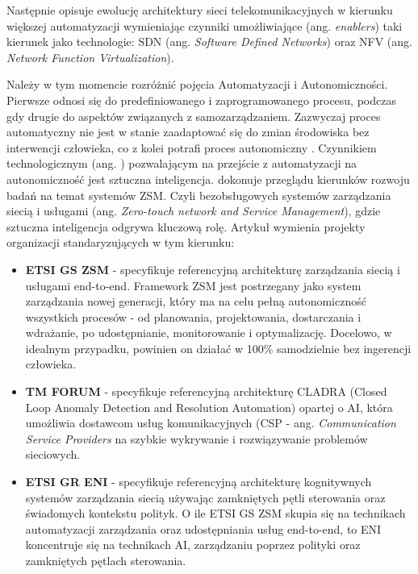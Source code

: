 Następnie \cite{doyle2014} opisuje ewolucję architektury sieci telekomunikacyjnych w kierunku większej automatyzacji wymieniając czynniki umożliwiające (ang. \textit{enablers}) taki kierunek jako technologie: SDN (ang. \textit{Software Defined Networks}) oraz NFV (ang. \textit{Network Function Virtualization}).

Należy w tym momencie rozróżnić pojęcia Automatyzacji i Autonomiczności. Pierwsze odnosi się do predefiniowanego i zaprogramowanego procesu, podczas gdy drugie do aspektów związanych z samozarządzaniem. Zazwyczaj proces automatyczny nie jest w stanie zaadaptować się do zmian środowiska bez interwencji człowieka, co z kolei potrafi proces autonomiczny \cite{ngmn2022}. Czynnikiem technologicznym (ang. ) pozwalającym na przejście z automatyzacji na autonomiczność jest sztuczna inteligencja. \cite{benzaid2020} dokonuje przeglądu kierunków rozwoju badań na temat systemów ZSM. Czyli bezobsługowych systemów zarządzania siecią i usługami (ang. \textit{Zero-touch network and Service Management}), gdzie sztuczna inteligencja odgrywa kluczową rolę. Artykuł wymienia projekty organizacji standaryzujących w tym kierunku:
\begin{itemize}
    \item \textbf{ETSI GS ZSM} - specyfikuje referencyjną architekturę zarządzania siecią i usługami end-to-end. Framework ZSM jest postrzegany jako system zarządzania nowej generacji, który ma na celu pełną autonomiczność wszystkich procesów - od planowania, projektowania, dostarczania i wdrażanie, po udostępnianie, monitorowanie i optymalizację. Docelowo, w idealnym przypadku, powinien on działać w 100\% samodzielnie bez ingerencji człowieka. 
    \item \textbf{TM FORUM} - specyfikuje referencyjną architekturę CLADRA (Closed Loop Anomaly Detection and Resolution Automation) opartej o AI, która umożliwia dostawcom usług komunikacyjnych (CSP - ang. \textit{Communication Service Providers} na szybkie wykrywanie i rozwiązywanie problemów sieciowych.
    \item \textbf{ETSI GR ENI} - specyfikuje referencyjną architekturę kognitywnych systemów zarządzania siecią używając zamkniętych pętli sterowania oraz świadomych kontekstu polityk. O ile ETSI GS ZSM skupia się na technikach automatyzacji zarządzania oraz udostępniania usług end-to-end, to ENI koncentruje się na technikach AI, zarządzaniu poprzez polityki oraz zamkniętych pętlach sterowania.
\end{itemize}

